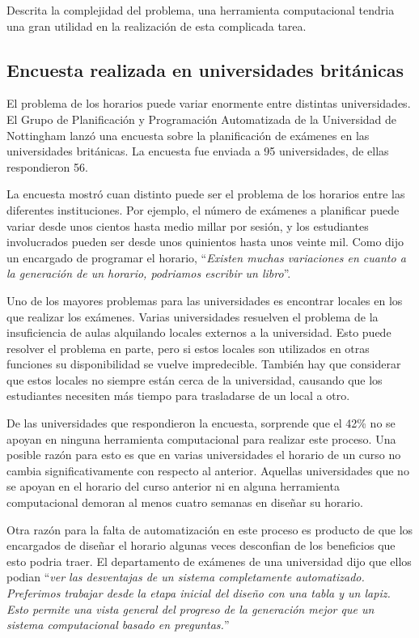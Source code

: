 Descrita la complejidad del problema, una herramienta computacional tendria una gran utilidad en la realización
de esta complicada tarea.

\subsection{Encuesta realizada en universidades británicas}

El problema de los horarios puede variar enormente entre distintas universidades. El Grupo de Planificación
y Programación Automatizada de la Universidad de Nottingham lanzó una encuesta \cite{survey of University of Nottingham} sobre la planificación de exámenes en las universidades británicas. La encuesta fue enviada a
95 universidades, de ellas respondieron 56.

La encuesta mostró cuan distinto puede ser el problema de los horarios entre las diferentes instituciones.
Por ejemplo, el número de exámenes a planificar puede variar desde unos cientos hasta medio millar por sesión,
y los estudiantes involucrados pueden ser desde unos quinientos hasta unos veinte mil. Como dijo un
encargado de programar el horario, ``\emph{Existen muchas variaciones en cuanto a la generación de un horario,
podriamos escribir un libro}''.

Uno de los mayores problemas para las universidades es encontrar locales en los que realizar los exámenes.
Varias universidades resuelven el problema de la insuficiencia de aulas alquilando locales externos a la
universidad. Esto puede resolver el problema en parte, pero si estos locales son utilizados en otras funciones
su disponibilidad se vuelve impredecible. También hay que considerar que estos locales no siempre están cerca de
la universidad, causando que los estudiantes necesiten más tiempo para trasladarse de un local a otro.

De las universidades que respondieron la encuesta, sorprende que el 42\% no se apoyan en ninguna herramienta
computacional para realizar este proceso. Una posible razón para esto es que en varias universidades el
horario de un curso no cambia significativamente con respecto al anterior. Aquellas universidades que no
se apoyan en el horario del curso anterior ni en alguna herramienta computacional demoran al menos cuatro
semanas en diseñar su horario.

Otra razón para la falta de automatización en este proceso es producto de que los encargados de diseñar el horario
algunas veces desconfian de los beneficios que esto podria traer. El departamento de exámenes de una universidad
dijo que ellos podian ``\emph{ver las desventajas de un sistema completamente automatizado. Preferimos trabajar
desde la etapa inicial del diseño con una tabla y un lapiz. Esto permite una vista general del progreso de la
generación mejor que un sistema computacional basado en preguntas.}''


